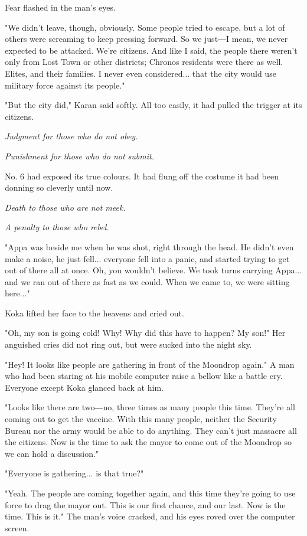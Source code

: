 Fear flashed in the man's eyes.

"We didn't leave, though, obviously. Some people tried to escape, but a
lot of others were screaming to keep pressing forward. So we just―I
mean, we never expected to be attacked. We're citizens. And like I said,
the people there weren't only from Lost Town or other districts; Chronos
residents were there as well. Elites, and their families. I never even
considered... that the city would use military force against its
people."

"But the city did," Karan said softly. All too easily, it had pulled the
trigger at its citizens.

\emph{Judgment for those who do not obey.}

\emph{Punishment for those who do not submit.}

No. 6 had exposed its true colours. It had flung off the costume it had
been donning so cleverly until now.

\emph{Death to those who are not meek.}

\emph{A penalty to those who rebel.}

"Appa was beside me when he was shot, right through the head. He didn't
even make a noise, he just fell... everyone fell into a panic, and
started trying to get out of there all at once. Oh, you wouldn't
believe. We took turns carrying Appa... and we ran out of there as fast
as we could. When we came to, we were sitting here..."

Koka lifted her face to the heavens and cried out.

"Oh, my son is going cold! Why! Why did this have to happen? My son!"
Her anguished cries did not ring out, but were sucked into the night
sky.

"Hey! It looks like people are gathering in front of the Moondrop
again." A man who had been staring at his mobile computer raise a bellow
like a battle cry. Everyone except Koka glanced back at him.

"Looks like there are two―no, three times as many people this time.
They're all coming out to get the vaccine. With this many people,
neither the Security Bureau nor the army would be able to do anything.
They can't just massacre all the citizens. Now is the time to ask the
mayor to come out of the Moondrop so we can hold a discussion."

"Everyone is gathering... is that true?"

"Yeah. The people are coming together again, and this time they're going
to use force to drag the mayor out. This is our first chance, and our
last. Now is the time. This is it." The man's voice cracked, and his
eyes roved over the computer screen.

